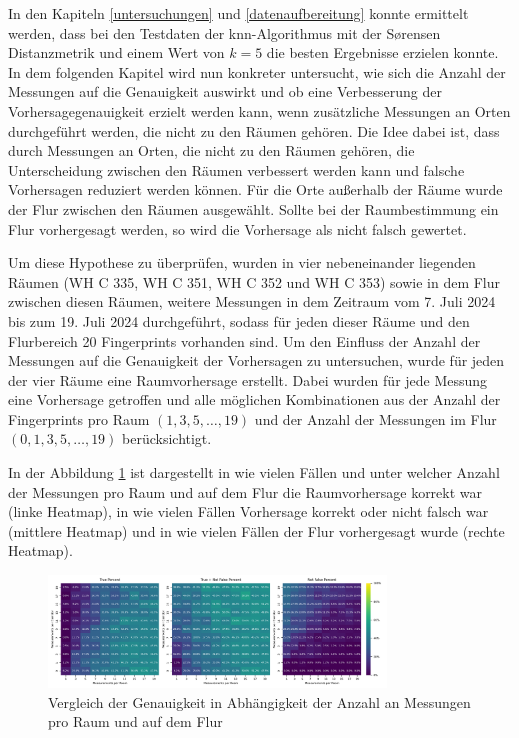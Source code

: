 In den Kapiteln \ref{untersuchungen} und \ref{datenaufbereitung} konnte ermittelt werden, dass bei den Testdaten der \gls{knn}-Algorithmus mit der Sørensen Distanzmetrik und einem Wert von \( k  = 5 \) die besten Ergebnisse erzielen konnte. In dem folgenden Kapitel wird nun konkreter untersucht, wie sich die Anzahl der Messungen auf die Genauigkeit auswirkt und ob eine Verbesserung der Vorhersagegenauigkeit erzielt werden kann, wenn zusätzliche Messungen an Orten durchgeführt werden, die nicht zu den Räumen gehören. Die Idee dabei ist, dass durch Messungen an Orten, die nicht zu den Räumen gehören, die Unterscheidung zwischen den Räumen verbessert werden kann und falsche Vorhersagen reduziert werden können. Für die Orte außerhalb der Räume wurde der Flur zwischen den Räumen ausgewählt. Sollte bei der Raumbestimmung ein Flur vorhergesagt werden, so wird die Vorhersage als nicht falsch gewertet.

Um diese Hypothese zu überprüfen, wurden in vier nebeneinander liegenden Räumen (WH C 335, WH C 351, WH C 352 und WH C 353) sowie in dem Flur zwischen diesen Räumen, weitere Messungen in dem Zeitraum vom 7. Juli 2024 bis zum 19. Juli 2024 durchgeführt, sodass für jeden dieser Räume und den Flurbereich 20 Fingerprints vorhanden sind. Um den Einfluss der Anzahl der Messungen auf die Genauigkeit der Vorhersagen zu untersuchen, wurde für jeden der vier Räume eine Raumvorhersage erstellt. Dabei wurden für jede Messung eine Vorhersage getroffen und alle möglichen Kombinationen aus der Anzahl der Fingerprints pro Raum \((1, 3, 5, \ldots, 19)\) und der Anzahl der Messungen im Flur \((0, 1, 3, 5, \ldots, 19)\) berücksichtigt.

In der Abbildung \ref{fig:12_corridor_01} ist dargestellt in wie vielen Fällen und unter welcher Anzahl der Messungen pro Raum und auf dem Flur die Raumvorhersage korrekt war (linke Heatmap), in wie vielen Fällen Vorhersage korrekt oder nicht falsch war (mittlere Heatmap) und in wie vielen Fällen der Flur vorhergesagt wurde (rechte Heatmap).

\begin{figure}[H]
    \centering
    \includegraphics[width=0.8\textwidth]{images/12_corridor_01.png}
    \caption{Vergleich der Genauigkeit in Abhängigkeit der Anzahl an Messungen pro Raum und auf dem Flur}
    \label{fig:12_corridor_01}
\end{figure}

